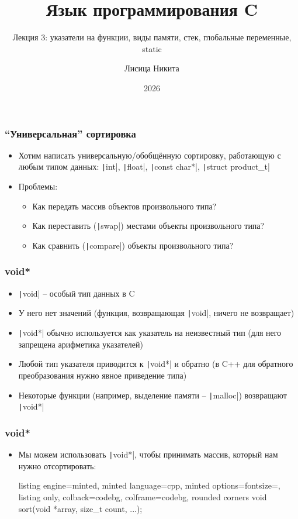 \documentclass[10pt]{beamer}
\title{Язык программирования C}
\subtitle{Лекция 3: указатели на функции, виды памяти, стек, глобальные переменные, static}
\author{Лисица Никита}
\date{2026}
\begin{document}
\frame{\titlepage}

\begin{frame}[fragile]
\frametitle{``Универсальная'' сортировка}
\begin{itemize}
\item Хотим написать универсальную/обобщённую сортировку, работающую с любым типом данных: \texttt|int|, \texttt|float|, \texttt|const char*|, \texttt|struct product_t|
\pause
\item Проблемы:
\begin{itemize}
\item Как передать массив объектов произвольного типа?
\pause
\item Как переставить (\texttt|swap|) местами объекты произвольного типа?
\pause
\item Как сравнить (\texttt|compare|) объекты произвольного типа?
\end{itemize}
\end{itemize}
\end{frame}

\begin{frame}[fragile]
\frametitle{void*}
\begin{itemize}
\item \texttt|void| -- особый тип данных в C
\pause
\item У него нет значений (функция, возвращающая \texttt|void|, ничего не возвращает)
\pause
\item \texttt|void*| обычно используется как указатель на неизвестный тип (для него запрещена арифметика указателей)
\pause
\item Любой тип указателя приводится к \texttt|void*| и обратно (в C++ для обратного преобразования нужно явное приведение типа)
\pause
\item Некоторые функции (например, выделение памяти -- \texttt|malloc|) возвращают \texttt|void*|
\end{itemize}
\end{frame}

\begin{frame}[fragile]
\frametitle{void*}
\begin{itemize}
\item Мы можем использовать \texttt|void*|, чтобы принимать массив, который нам нужно отсортировать:
\begin{tcblisting}{listing engine=minted, minted language=cpp, minted options={fontsize=\scriptsize}, listing only, colback=codebg, colframe=codebg, rounded corners}
void sort(void *array, size_t count, ...);
\end{tcblisting}
\end{itemize}
\end{frame}
\end{document}
